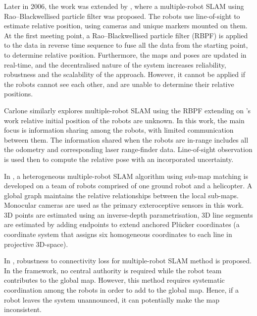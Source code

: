 Later in 2006, the work was extended by \cite{Howard2006a}, where a multiple-robot SLAM using Rao–Blackwellised particle filter was proposed. The robots use line-of-sight to estimate relative position, using cameras and unique markers mounted on them. At the first meeting point, a Rao–Blackwellised particle filter (RBPF) is applied to the data in reverse time sequence to fuse all the data from the starting point, to determine relative position. Furthermore, the maps and poses are updated in real-time, and the decentralised nature of the system increases reliability, robustness and the scalability of the approach. However, it cannot be applied if the robots cannot see each other, and are unable to determine their relative positions. 

Carlone \cite{Carlone2010a} similarly explores multiple-robot SLAM using the RBPF extending on \cite{Howard2006a}'s work relative initial position of the robots are unknown. In this work, the main focus is information sharing among the robots, with limited communication between them. The information shared when the robots are in-range includes all the odometry and corresponding laser range-finder data. Line-of-sight observation is used then to compute the relative pose with an incorporated uncertainty. 

In \cite{VidalCalleja2011}, a heterogeneous multiple-robot SLAM algorithm using sub-map matching is developed on a team of robots comprised of one ground robot and a helicopter. A global graph maintains the relative relationships between the local sub-maps. Monocular cameras are used as the primary exteroceptive sensors in this work. 3D points are estimated using an inverse-depth parametrisation, 3D line segments are estimated by adding endpoints to extend anchored Pl\"ucker coordinates (a coordinate system that assigns six homogeneous coordinates to each line in projective 3D-space\cite{ZHAO2014113}).

In \cite{Quraishi2016}, robustness to connectivity loss for multiple-robot SLAM method is proposed. In the framework, no central authority is required while the robot team contributes to the global map. However, this method requires systematic coordination among the robots in order to add to the global map. Hence, if a robot leaves the system unannounced, it can potentially make the map inconsistent.

